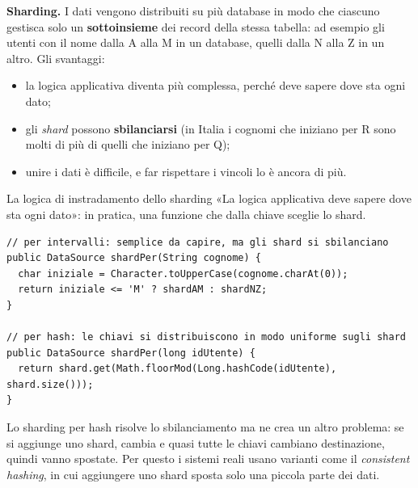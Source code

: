 \noindent\begin{minipage}[c]{0.56\textwidth}
\textbf{Sharding.} I dati vengono distribuiti su più database in modo che ciascuno gestisca solo un \textbf{sottoinsieme}
dei record della stessa tabella: ad esempio gli utenti con il nome dalla A alla M in un database, quelli dalla N alla Z in
un altro. Gli svantaggi:
\begin{itemize}
  \item la logica applicativa diventa più complessa, perché deve sapere dove sta ogni dato;
  \item gli \textit{shard} possono \textbf{sbilanciarsi} (in Italia i cognomi che iniziano per R sono molti di più di
        quelli che iniziano per Q);
  \item unire i dati è difficile, e far rispettare i vincoli lo è ancora di più.
\end{itemize}
\end{minipage}\hfill
\begin{minipage}[c]{0.4\textwidth}
\centering
{}
\end{minipage}

\begin{esempio}{La logica di instradamento dello sharding}
«La logica applicativa deve sapere dove sta ogni dato»: in pratica, una funzione che dalla chiave sceglie lo shard.
\begin{lstlisting}[style=java, name=Shard.java]
// per intervalli: semplice da capire, ma gli shard si sbilanciano
public DataSource shardPer(String cognome) {
  char iniziale = Character.toUpperCase(cognome.charAt(0));
  return iniziale <= 'M' ? shardAM : shardNZ;
}

// per hash: le chiavi si distribuiscono in modo uniforme sugli shard
public DataSource shardPer(long idUtente) {
  return shard.get(Math.floorMod(Long.hashCode(idUtente), shard.size()));
}
\end{lstlisting}
Lo sharding per hash risolve lo sbilanciamento ma ne crea un altro problema: se si aggiunge uno shard, cambia
 e quasi tutte le chiavi cambiano destinazione, quindi vanno spostate. Per questo i sistemi reali usano
varianti come il \textit{consistent hashing}, in cui aggiungere uno shard sposta solo una piccola parte dei dati.
\end{esempio}

